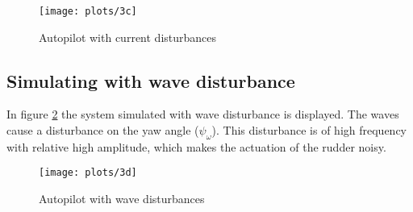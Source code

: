 \begin{figure}[!htb]
    \caption{Autopilot with current disturbances}
    \centering
    \centerline{\texttt{[image: plots/3c]}} %
\label{plot:3c}
\end{figure}

\newpage
\subsection{Simulating with wave disturbance}

In figure \ref{plot:3d} the system simulated with wave disturbance is displayed. The waves cause a disturbance on the yaw angle ($\psi_{\omega}$). This disturbance is of high frequency with relative high amplitude, which makes the actuation of the rudder noisy. 


\begin{figure}[!htb]
    \caption{Autopilot with wave disturbances}
    \centering
    \centerline{\texttt{[image: plots/3d]}} %
\label{plot:3d}
\end{figure}